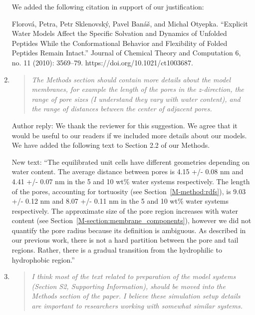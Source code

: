 \documentclass{article}
\begin{document}
\begin{enumerate}
  	We added the following citation in support of our justification:

    Florov\'{a}, Petra, Petr Sklenovsk\'{y}, Pavel Ban\'{a}\v{s}, and Michal Otyepka. “Explicit Water 
    Models Affect the Specific Solvation and Dynamics of Unfolded Peptides While the 
    Conformational Behavior and Flexibility of Folded Peptides Remain Intact.” Journal 
    of Chemical Theory and Computation 6, no. 11 (2010): 3569--79. https://doi.org/10.1021/ct1003687.

    \item \begin{quote}
    
    \textit{The Methods section should contain more details about the model membranes, for 
    example the length of the pores in the z-direction, the range of pore sizes (I understand
    they vary with water content), and the range of distances between the center of adjacent pores.}    
    
    \end{quote}
    
    Author reply: We thank the reviewer for this suggestion. We agree that it would be useful
    to our readers if we included more details about our models. We have added the following 
    text to Section 2.2 of our Methods.
    
    New text: ``The equilibrated unit cells have different geometries depending on water
    content. The average distance between pores is 4.15 +/- 0.08 nm and 4.41 +/- 0.07 nm
    in the 5 and 10 wt\% water systems respectively. The length of the pores, accounting
    for tortuosity (see Section~\ref{M-method:rdfs}), is 9.03 +/- 0.12 nm and 8.07 +/- 0.11
    nm in the 5 and 10 wt\% water systems respectively. The approximate size of the pore
    region increases with water content (see Section~\ref{M-section:membrane_components}), 
    however we did not quantify the pore radius because its definition is ambiguous. As
    described in our previous work, there is not a hard partition between the pore and tail
    regions. Rather, there is a gradual transition from the hydrophilic to hydrophobic region.''  
    
    \item \begin{quote}
    
    \textit{I think most of the text related to preparation of the model systems (Section S2, 
    Supporting Information), should be moved into the Methods section of the paper. I believe 
    these simulation setup details are important to researchers working with somewhat similar 
    systems.}
    

\end{quote}
\end{enumerate}
\end{document}
